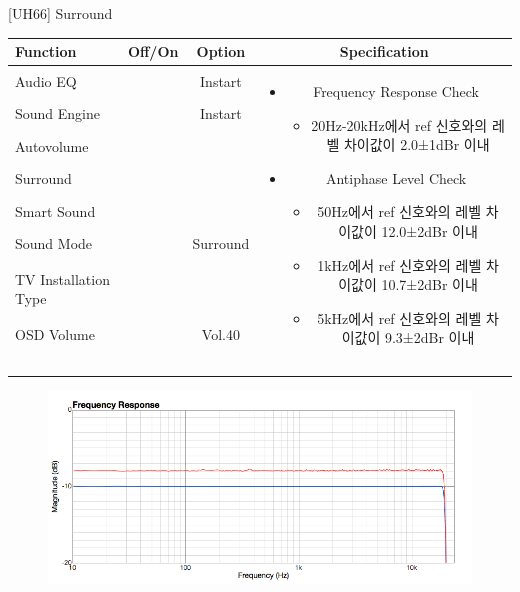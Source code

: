 \begin{frame}[t]{[UH66] Surround}
\begin{tiny}
\begin{tabular}{@{}lccc@{}}
\toprule
Function & Off/On & Option & Specification \\
\midrule
Audio EQ & \color{black}{Off} & Instart &
\multirow{10}{60mm}{
\begin{itemize}\vspace{-3mm}
\item Frequency Response Check
	\begin{itemize}
	\item 20Hz-20kHz에서 ref 신호와의 레벨 차이값이 2.0±1dBr 이내
	\end{itemize}
\item Antiphase Level Check
	\begin{itemize}
	\item 50Hz에서 ref 신호와의 레벨 차이값이 12.0±2dBr 이내
	\item 1kHz에서 ref 신호와의 레벨 차이값이 10.7±2dBr 이내
	\item 5kHz에서 ref 신호와의 레벨 차이값이 9.3±2dBr 이내
	\end{itemize}
\end{itemize}
} \\
Sound Engine & \color{blue}{On} & Instart & \\
Autovolume & \color{black}{Off} & & \\
Surround & \color{blue}{On} & & \\
Smart Sound & \color{black}{Off} & & \\
Sound Mode & \color{blue}{On} & Surround & \\
TV Installation Type & \color{blue}{On} & \color{black}{Standtype1} & \\
OSD Volume & \color{blue}{On} & Vol.40 & \\
& & & \\
& & & \\
& & & \\
& & & \\
\midrule
\end{tabular}
\end{tiny}

\begin{figure}[b]
\includegraphics[height=0.4\textwidth]{figures/surround.png}
\end{figure}

\end{frame}
